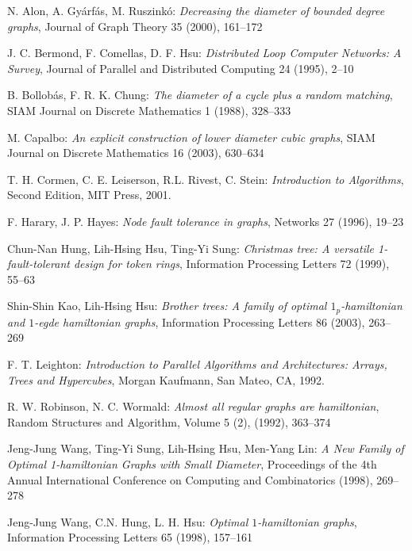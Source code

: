\documentclass[10pt,a4paper]{article}
\begin{document}
\begin{thebibliography}{99}

  N. Alon, A. Gy\'{a}rf\'{a}s, M. Ruszink\'{o}: \textit{Decreasing the diameter of bounded degree graphs},
  Journal of Graph Theory 35 (2000), 161--172

  J. C. Bermond, F. Comellas, D. F. Hsu: \textit{Distributed Loop Computer Networks: A Survey},
  Journal of Parallel and Distributed Computing 24 (1995), 2--10


  B. Bollob\' as, F. R. K. Chung: \textit{The diameter of a cycle plus
  a random matching}, SIAM Journal on Discrete Mathematics 1 (1988), 328--333

  M. Capalbo: \textit{An explicit construction of lower diameter cubic graphs}, SIAM Journal  on Discrete Mathematics 16
  (2003), 630--634

  T. H. Cormen, C. E. Leiserson, R.L. Rivest, C. Stein: \textit{Introduction to Algorithms}, Second Edition, MIT
  Press, 2001.


  F. Harary, J. P. Hayes: \textit{Node fault tolerance in graphs},
  Networks 27 (1996), 19--23

  Chun-Nan Hung, Lih-Hsing Hsu, Ting-Yi Sung: \textit{Christmas tree: A versatile 1-fault-tolerant design for token rings},
  Information Processing Letters 72 (1999), 55--63


  Shin-Shin Kao, Lih-Hsing Hsu: \textit{Brother trees: A family of optimal $1_p$-hamiltonian and $1$-egde hamiltonian graphs},
  Information Processing Letters 86 (2003), 263--269

  F. T. Leighton: \textit{Introduction to Parallel Algorithms and
  Architectures: Arrays, Trees and Hypercubes}, Morgan Kaufmann, San
  Mateo, CA, 1992.

  R. W. Robinson, N. C. Wormald: \textit{Almost all regular graphs are hamiltonian},
  Random Structures and Algorithm, Volume 5 (2), (1992), 363--374

  Jeng-Jung Wang, Ting-Yi Sung, Lih-Hsing Hsu, Men-Yang Lin:
  \textit{A New Family of Optimal 1-hamiltonian Graphs with Small Diameter},
  Proceedings of the 4th Annual International Conference on Computing and Combinatorics
  (1998), 269--278

  Jeng-Jung Wang, C.N. Hung, L. H. Hsu:
  \textit{Optimal $1$-hamiltonian graphs}, Information Processing Letters 65
  (1998), 157--161

\end{thebibliography}
\end{document}
